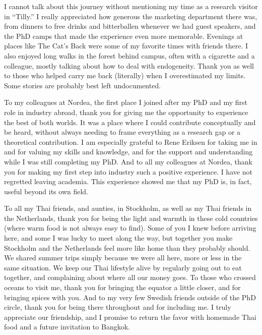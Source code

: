 I cannot talk about this journey without mentioning my time as a research visitor in “Tilly.” I really appreciated how generous the marketing department there was, from dinners to free drinks and bitterballen whenever we had guest speakers, and the PhD camps that made the experience even more memorable. Evenings at places like The Cat’s Back were some of my favorite times with friends there. I also enjoyed long walks in the forest behind campus, often with a cigarette and a colleague, mostly talking about how to deal with endogeneity. Thank you as well to those who helped carry me back (literally) when I overestimated my limits. Some stories are probably best left undocumented.

To my colleagues at Nordea, the first place I joined after my PhD and my first role in industry abroad, thank you for giving me the opportunity to experience the best of both worlds. It was a place where I could contribute conceptually and be heard, without always needing to frame everything as a research gap or a theoretical contribution. I am especially grateful to Rene Eriksen for taking me in and for valuing my skills and knowledge, and for the support and understanding while I was still completing my PhD. And to all my colleagues at Nordea, thank you for making my first step into industry such a positive experience. I have not regretted leaving academia. This experience showed me that my PhD is, in fact, useful beyond its own field.

To all my Thai friends, and aunties, in Stockholm, as well as my Thai friends in the Netherlands, thank you for being the light and warmth in these cold countries (where warm food is not always easy to find). Some of you I knew before arriving here, and some I was lucky to meet along the way, but together you make Stockholm and the Netherlands feel more like home than they probably should. We shared summer trips simply because we were all here, more or less in the same situation. We keep our Thai lifestyle alive by regularly going out to eat together, and complaining about where all our money goes. To those who crossed oceans to visit me, thank you for bringing the equator a little closer, and for bringing spices with you. And to my very few Swedish friends outside of the PhD circle, thank you for being there throughout and for including me. I truly appreciate our friendship, and I promise to return the favor with homemade Thai food and a future invitation to Bangkok.

